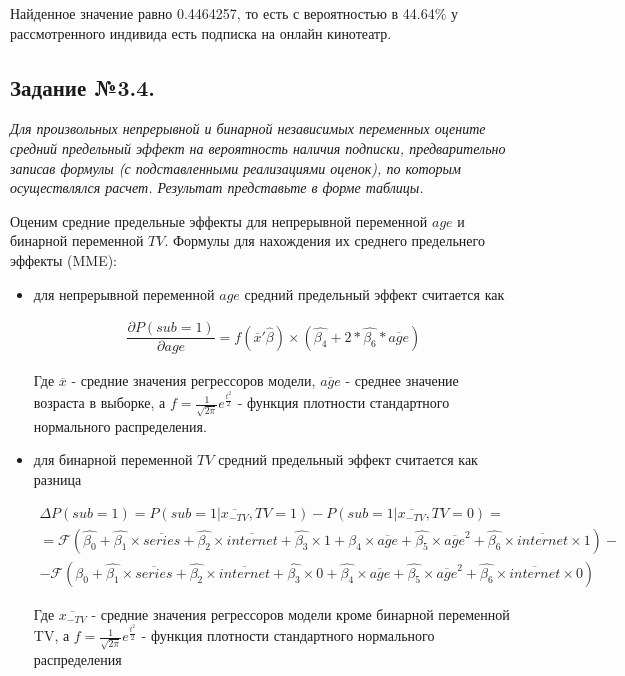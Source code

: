 \documentclass[a4paper,12pt]{article}
\begin{document}
	Найденное значение равно 0.4464257, то есть с вероятностью в 44.64\% у рассмотренного индивида есть подписка на онлайн кинотеатр.
	
	\subsection{Задание №3.4.}
	\textit{
	Для произвольных непрерывной и бинарной независимых переменных оцените средний предельный эффект на вероятность наличия подписки, предварительно записав формулы (с подставленными реализациями оценок), по которым осуществлялся расчет. Результат представьте в форме таблицы. }
	
	\vspace{0.4cm}
	
	Оценим средние предельные эффекты для непрерывной переменной $age$ и бинарной переменной $TV$. Формулы для нахождения их среднего предельнего эффекты (MME):
	
	\begin{itemize}
		\item для непрерывной переменной $age$ средний предельный эффект считается как
		
			\begin{align*}
				\dfrac{\partial P(sub=1)}{\partial age} = f (\overline{x}'\hat{\beta})\times (\hat{\beta_4} +
				2*\hat{\beta_6}*\overline{age})
			\end{align*}
		
			Где $\overline{x}$ - средние значения регрессоров модели, $\overline{age}$ - среднее значение возраста в выборке, а $f=\frac{1}{\sqrt{2\pi}} e^{\frac{t^2}{2}}$ - функция плотности стандартного нормального распределения.
			
		
		\item для бинарной переменной $TV$ средний предельный эффект считается как разница
		
		\begin{align*}
			\Delta P(sub=1) = P(sub=1|\overline{x_{-TV}},TV=1)-P(sub=1|\overline{x_{-TV}},TV=0) = \\
			= \mathcal{F} (\hat{\beta_0} + \hat{\beta_1} \times \overline{series}+ \hat{\beta_2} \times \overline{internet} +\hat{\beta_3}  \times 1 + \hat{\beta_4} \times \overline{age} + \hat{\beta_5}\times \overline{age}^2 +\hat{\beta_6} \times \overline{internet}\times 1) - \\
			- \mathcal{F} (\hat{\beta_0} + \hat{\beta_1} \times \overline{series}+ \hat{\beta_2} \times \overline{internet} +\hat{\beta_3}  \times 0 + \hat{\beta_4} \times \overline{age} + \hat{\beta_5}\times \overline{age}^2 +\hat{\beta_6} \times \overline{internet}\times 0)
		\end{align*}
	
		Где $\overline{x_{-TV}}$ - средние значения регрессоров модели кроме бинарной переменной TV, а $f=\frac{1}{\sqrt{2\pi}} e^{\frac{t^2}{2}}$ - функция плотности стандартного нормального распределения
		
	\end{itemize}
\end{document}
